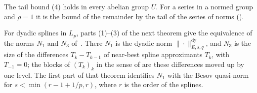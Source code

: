 The tail bound (4) holds in every abelian group $U$. For a series in a normed group and
$\rho = 1$ it is the bound of the remainder by the tail of the series of norms
().

For dyadic splines in $L_p$, parts (1)--(3) of the next theorem give the equivalence of the norms
$N_1$ and $N_3$ of~\cite[Theorem~5.1]{DeVorePopovTAMS}. There $N_1$ is the dyadic norm
$\|\cdot\|^{\mathrm{dy}}_{E, s, q}$, and $N_3$ is the size of the differences $T_k - T_{k-1}$ of
near-best spline approximants $T_k$, with $T_{-1} = 0$; the blocks of $(T_k)_k$ in the sense of
 are these differences moved up by one level. The first part of
that theorem identifies $N_1$ with the Besov quasi-norm for $s < \min(r - 1 + 1/p, r)$, where $r$
is the order of the splines.


